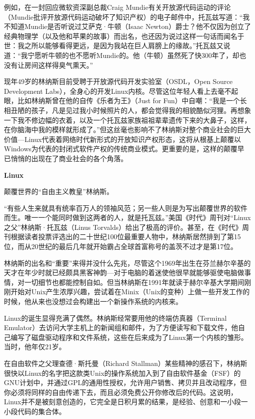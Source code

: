 \documentclass[doctor,openright,twoside]{sjtuthesis}
\theoremstyle{plain}
\theoremstyle{definition}
\theoremstyle{remark}
\theoremstyle{ocrenumbox}
\theoremstyle{plain}
\newcommand\cqh{“}
\newcommand\cqt{”}
\begin{document}
例如，在一封回应微软资深副总裁Craig
Mundie有关开放源代码运动的评论（Mundie批评开放源代码运动破坏了知识产权）的电子邮件中，托瓦兹写道：\cqh 我不知道Mundie是否听说过艾萨克·牛顿（Isaac
Newton）爵士？他不仅因为创立了经典物理学（以及他和苹果的故事）而出名，也还因为说过这样一句话而闻名于世：我之所以能够看得更远，是因为我站在巨人肩膀上的缘故。\cqt 托瓦兹又说道：\cqh 我宁愿听牛顿的也不愿听Mundie的。他（牛顿）虽然死了快300年了，却也没有让房间这样得臭气熏天。\cqt 

现年49岁的林纳斯目前受聘于开放源代码开发实验室（OSDL，Open Source
Development
Labs），全身心的开发Linux内核。尽管这位年轻人看上去毫不起眼，比如林纳斯曾在他的自传《乐者为王》（Just
for
Fun）中自嘲：\cqh 我是一个长相丑陋的孩子，凡是见过我小时候照片的人，都会觉得我的相貌酷似河狸。再想象一下我不修边幅的衣着，以及一个托瓦兹家族祖祖辈辈遗传下来的大鼻子，这样，在你脑海中我的模样就形成了。\cqt 但这丝毫也影响不了林纳斯对整个商业社会的巨大价值---Linux代表着网络时代新形式的开放知识产权形态，这将从根基上颠覆以Windows为代表的封闭式软件产权的传统商业模式。更重要的是，这样的颠覆早已悄悄的出现在了商业社会的各个角落。

\textbf{Linux}

颠覆世界的\cqh 自由主义教皇\cqt 林纳斯。

\cqh 有些人生来就具有统率百万人的领袖风范；另一些人则是为写出颠覆世界的软件而生。唯一一个能同时做到这两者的人，就是托瓦兹。\cqt 美国《时代》周刊对\cqh Linux之父\cqt 林纳斯·托瓦兹（Linus
Torvalds）给出了极高的评价。甚至，在《时代》周刊根据读者投票评选出的二十世纪100位最重要人物中，林纳斯居然排到了第15位，而从20世纪的最后几年就开始霸占全球首富称号的盖茨不过才是第17位。

林纳斯的出名和\cqh 重要\cqt 来得并没什么先兆，尽管这个1969年出生在芬兰赫尔辛基的天才在年少时就已经颇具黑客神韵---对于电脑的着迷使他很早就能够驱使电脑做事情，对一切细节也都能控制自如。但当林纳斯在1991年就读于赫尔辛基大学期间刚刚开始对Unix产生浓厚兴趣，尝试着在Minix（Unix的变种）上做一些开发工作的时候，他从来也没想过会构建出一个新操作系统的内核来。

Linux的诞生显得充满了偶然。林纳斯经常要用他的终端仿真器（Terminal
Emulator）去访问大学主机上的新闻组和邮件，为了方便读写和下载文件，他自己编写了磁盘驱动程序和文件系统，这些在后来成为了Linux第一个内核的雏形。当时，他年仅21岁。

在自由软件之父理查德·斯托曼（Richard
Stallman）某些精神的感召下，林纳斯很快以Linux的名字把这款类Unix的操作系统加入到了自由软件基金（FSF）的GNU计划中，并通过GPL的通用性授权，允许用户销售、拷贝并且改动程序，但你必须将同样的自由传递下去，而且必须免费公开你修改后的代码。这说明，Linux并不是被刻意创造的，它完全是日积月累的结果，是经验、创意和一小段一小段代码的集合体。
\end{document}
